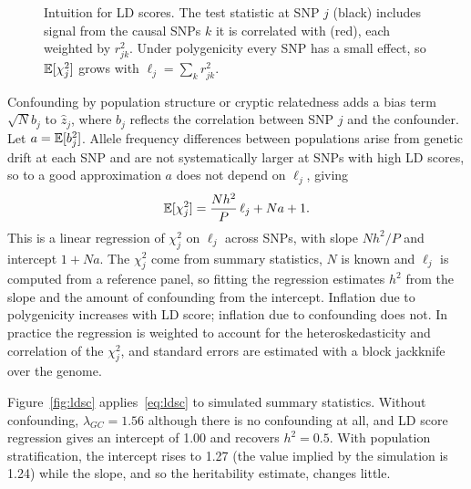\begin{figure}[!htbp]
  \centering
  \caption{Intuition for LD scores. The test statistic at SNP $j$ (black) includes signal from the causal SNPs $k$ it is correlated with (red), each weighted by $r_{jk}^2$. Under polygenicity every SNP has a small effect, so $\mathbb{E}[\chi_j^2]$ grows with $\ell_j=\sum_kr_{jk}^2$.}
  \label{fig:ldscore_schematic}
\end{figure}

Confounding by population structure or cryptic relatedness adds a bias term $\sqrt Nb_j$ to $\hat z_j$, where $b_j$ reflects the correlation between SNP $j$ and the confounder. Let $a=\mathbb{E}[b_j^2]$. Allele frequency differences between populations arise from genetic drift at each SNP and are not systematically larger at SNPs with high LD scores, so to a good approximation $a$ does not depend on $\ell_j$, giving
\begin{equation}
  \mathbb{E}[\chi^2_j] = \frac{Nh^2}P\,\ell_j + Na + 1 .
  \label{eq:ldsc}
\end{equation}
This is a linear regression of $\chi^2_j$ on $\ell_j$ across SNPs, with slope $Nh^2/P$ and intercept $1+Na$. The $\chi^2_j$ come from summary statistics, $N$ is known and $\ell_j$ is computed from a reference panel, so fitting the regression estimates $h^2$ from the slope and the amount of confounding from the intercept. Inflation due to polygenicity increases with LD score; inflation due to confounding does not. In practice the regression is weighted to account for the heteroskedasticity and correlation of the $\chi^2_j$, and standard errors are estimated with a block jackknife over the genome.

Figure~\ref{fig:ldsc} applies~\eqref{eq:ldsc} to simulated summary statistics. Without confounding, $\lambda_{GC}=1.56$ although there is no confounding at all, and LD score regression gives an intercept of 1.00 and recovers $h^2=0.5$. With population stratification, the intercept rises to 1.27 (the value implied by the simulation is 1.24) while the slope, and so the heritability estimate, changes little.

